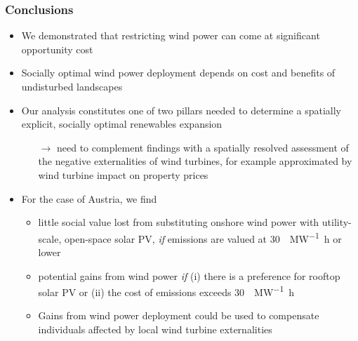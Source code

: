 \documentclass[aspectratio=1610, xcolor=dvipsnames,handout]{beamer} %
\begin{document}
    \begin{frame}
        \frametitle{Conclusions}
        \begin{itemize}
            \item We demonstrated that restricting wind power can come at significant opportunity cost
            \item Socially optimal wind power deployment depends on cost and benefits of undisturbed landscapes
            \item Our analysis constitutes one of two pillars needed to determine a spatially explicit, socially
            optimal renewables expansion
            \begin{itemize}
                \item[$\rightarrow$] need to complement findings with a spatially resolved assessment of the negative
                externalities of wind turbines, for example approximated by wind turbine impact on property prices
            \end{itemize}
            \medskip
            \item For the case of Austria, we find
            \begin{itemize}
                \item little social value lost from substituting onshore wind power with utility-scale, open-space solar PV,
                \emph{if}  emissions are valued at \SI{30}{\text{\euro}\per\mega\watt\hour} or lower
                \item potential gains from wind power \emph{if} (i) there is a preference for rooftop solar PV or (ii)
                the cost of  emissions exceeds \SI{30}{\text{\euro}\per\mega\watt\hour}
                \item Gains from wind power deployment could be used to compensate individuals affected by local wind turbine
                externalities
            \end{itemize}
        \end{itemize}
    \end{frame}
\end{document}
